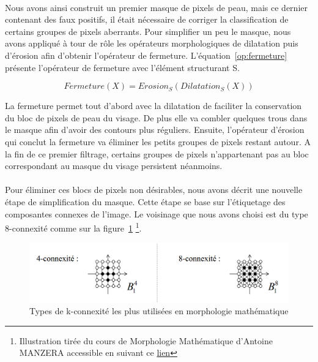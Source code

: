 \documentclass[11pt, french]{report-rd-info}
\begin{document}
\paragraph*{}
Nous avons ainsi construit un premier masque de pixels de peau, mais ce dernier contenant des faux positifs, il était nécessaire de corriger la classification de certains groupes de pixels aberrants. Pour simplifier un peu le masque, nous avons appliqué à tour de rôle les opérateurs morphologiques de dilatation puis d'érosion afin d'obtenir l'opérateur de fermeture. L'équation~\ref{op:fermeture} présente l'opérateur de fermeture avec l'élément structurant S.

\begin{equation}
Fermeture(X) = Erosion_S(Dilatation_S(X))
\label{op:fermeture}
\end{equation}

La fermeture permet tout d'abord avec la dilatation de faciliter la conservation du bloc de pixels de peau du visage. De plus elle va combler quelques trous dans le masque afin d'avoir des contours plus réguliers. Ensuite, l'opérateur d'érosion qui conclut la fermeture va éliminer les petits groupes de pixels restant autour. A la fin de ce premier filtrage, certains groupes de pixels n'appartenant pas au bloc correspondant au masque du visage persistent néanmoins.

\paragraph*{}
Pour éliminer ces blocs de pixels non désirables, nous avons décrit une nouvelle étape de simplification du masque. Cette étape se base sur l'étiquetage des composantes connexes de l'image. Le voisinage que nous avons choisi est du type 8-connexité comme sur la figure~\ref{diag:connexite} \footnote{Illustration tirée du cours de Morphologie Mathématique d'Antoine MANZERA accessible en suivant ce \href{https://www.google.fr/url?sa=t&rct=j&q=&esrc=s&source=web&cd=5&cad=rja&ved=0CFAQFjAE&url=http\%3A\%2F\%2Fwwwdfr.ensta.fr\%2FCours\%2Fdocs\%2FESE42\%2FEse4_chap4.pdf&ei=QnD7UobSCom10wWJ6YFo&usg=AFQjCNH4V0RA2P8KrsXDAYVEat60hdGgng&sig2=sqagrklYfjkCL5fLUTMIog}{lien}}.

\begin{figure}
\centering
\includegraphics[scale=0.5]{Images/connexite}
\caption{Types de k-connexité les plus utilisées en morphologie mathématique}
\label{diag:connexite}
\end{figure}
\end{document}
